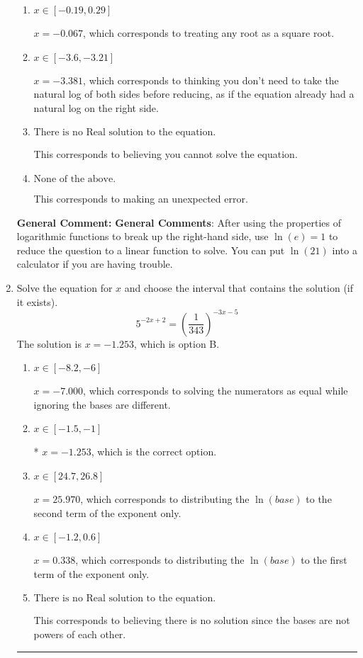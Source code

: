 \documentclass{extbook}[14pt]
\newcommand{\litem}[1]{\item #1

\rule{\textwidth}{0.4pt}}
\begin{document}
\begin{enumerate}
{\begin{enumerate}[label=\Alph*.]
* $x = -0.515$, which is the correct option.
\item \( x \in [-0.19, 0.29] \)

$x = -0.067$, which corresponds to treating any root as a square root.
\item \( x \in [-3.6, -3.21] \)

$x = -3.381$, which corresponds to thinking you don't need to take the natural log of both sides before reducing, as if the equation already had a natural log on the right side.
\item \( \text{There is no Real solution to the equation.} \)

This corresponds to believing you cannot solve the equation.
\item \( \text{None of the above.} \)

This corresponds to making an unexpected error.
\end{enumerate}

\textbf{General Comment:} \textbf{General Comments}: After using the properties of logarithmic functions to break up the right-hand side, use $\ln(e) = 1$ to reduce the question to a linear function to solve. You can put $\ln(21)$ into a calculator if you are having trouble.
}
\litem{
Solve the equation for $x$ and choose the interval that contains the solution (if it exists).
\[ 5^{-2x+2} = \left(\frac{1}{343}\right)^{-3x-5} \]The solution is \( x = -1.253 \), which is option B.\begin{enumerate}[label=\Alph*.]
\item \( x \in [-8.2, -6] \)

$x = -7.000$, which corresponds to solving the numerators as equal while ignoring the bases are different.
\item \( x \in [-1.5, -1] \)

* $x = -1.253$, which is the correct option.
\item \( x \in [24.7, 26.8] \)

$x = 25.970$, which corresponds to distributing the $\ln(base)$ to the second term of the exponent only.
\item \( x \in [-1.2, 0.6] \)

$x = 0.338$, which corresponds to distributing the $\ln(base)$ to the first term of the exponent only.
\item \( \text{There is no Real solution to the equation.} \)

This corresponds to believing there is no solution since the bases are not powers of each other.
\end{enumerate}

}
\end{enumerate}
\end{document}

